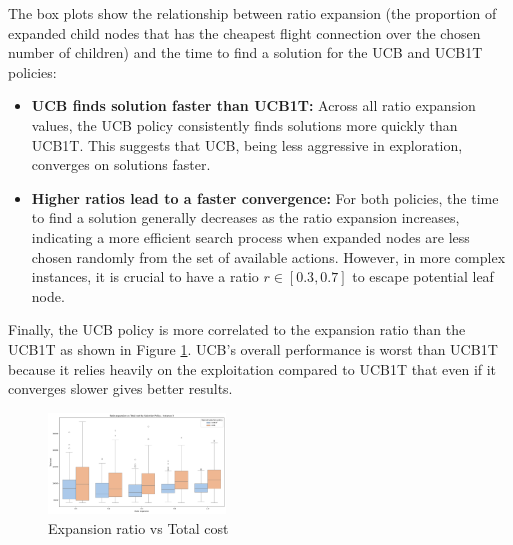 \documentclass[conference]{IEEEtran}
\begin{document}
The box plots show the relationship between ratio expansion (the proportion of expanded child nodes that has the cheapest flight connection over the chosen number of children) and the time to find a solution for the UCB and UCB1T policies:

\begin{itemize}
    \item \textbf{UCB finds solution faster than UCB1T:}
          Across all ratio expansion values, the UCB policy consistently finds solutions more quickly than UCB1T. This suggests that UCB, being less aggressive in exploration, converges on solutions faster.


    \item \textbf{Higher ratios lead to a faster convergence:}
          For both policies, the time to find a solution generally decreases as the ratio expansion increases, indicating a more efficient search process when expanded nodes are less chosen randomly from the set of available actions. However, in more complex instances, it is crucial to have a ratio $r \in [0.3,0.7]$ to escape potential leaf node.
\end{itemize}

Finally, the UCB policy is more correlated to the expansion ratio than the UCB1T as shown in Figure \ref{fig:ratio_vs_cost_3}. UCB's overall performance is worst than UCB1T because it relies heavily on the exploitation compared to UCB1T that even if it converges slower gives better results.

\begin{figure}[!ht]
    \centering
    \includegraphics[width=0.42\textwidth]{Figures/3 - ratio_vs_cost.png}
    \caption{Expansion ratio vs Total cost}
    \label{fig:ratio_vs_cost_3}
\end{figure}
\end{document}

